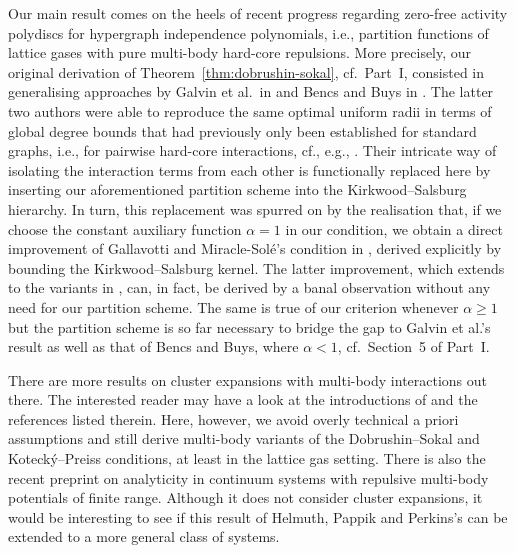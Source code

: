 \documentclass[reqno, 11pt]{amsart}
\theoremstyle{definition}
\begin{document}
Our main result comes on the heels of recent progress regarding zero-free activity polydiscs for hypergraph independence polynomials, i.e., partition functions of lattice gases with pure multi-body hard-core repulsions. 
More precisely, our original derivation of Theorem~\ref{thm:dobrushin-sokal}, cf.\ Part~I, consisted in generalising approaches by Galvin et al.\ in \cite{ref:galvin-et-al} and Bencs and Buys in \cite{ref:bencs-buys}. 
The latter two authors were able to reproduce the same optimal uniform radii in terms of global degree bounds that had previously only been established for standard graphs, i.e., for pairwise hard-core interactions, cf., e.g., \cite{ref:scott-sokal}. 
Their intricate way of isolating the interaction terms from each other is functionally replaced here by inserting our aforementioned partition scheme into the Kirkwood--Salsburg hierarchy. 
In turn, this replacement was spurred on by the realisation that, if we choose the constant auxiliary function $\alpha = 1$ in our condition, we obtain a direct improvement of Gallavotti and Miracle-Sol{\'e}'s condition in \cite{ref:gallavotti-miracle-sole}, derived explicitly by bounding the Kirkwood--Salsburg kernel. 
The latter improvement, which extends to the variants in \cite{ref:gallavotti-miracle-sole-robinson, ref:ruelle}, can, in fact, be derived by a banal observation without any need for our partition scheme. 
The same is true of our criterion whenever $\alpha \geq 1$ but the partition scheme is so far necessary to bridge the gap to Galvin et al.'s result as well as that of Bencs and Buys, where $\alpha < 1$, cf.\ Section~5 of Part~I.

There are more results on cluster expansions with multi-body interactions out there. 
The interested reader may have a look at the introductions of \cite{ref:jansen-tsagkarogiannis, ref:galvin-et-al, ref:nguyen-fernandez} and the references listed therein. 
Here, however, we avoid overly technical a priori assumptions and still derive multi-body variants of the Dobrushin--Sokal and Koteck{\'y}--Preiss conditions, at least in the lattice gas setting. 
There is also the recent preprint \cite{ref:helmuth-pappik-perkins} on analyticity in continuum systems with repulsive multi-body potentials of finite range. 
Although it does not consider cluster expansions, it would be interesting to see if this result of Helmuth, Pappik and Perkins's can be extended to a more general class of systems.
\end{document}
